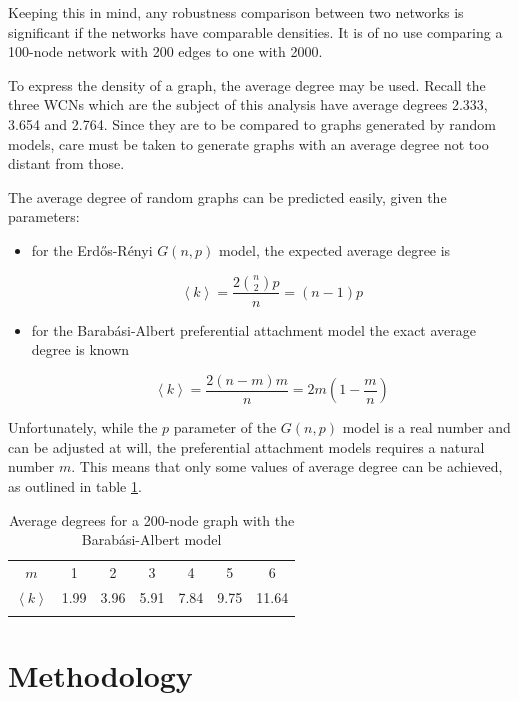 \documentclass[a4paper,11pt,twoside,openright]{memoir}
\begin{document}
Keeping this in mind, any robustness comparison between two networks is
significant if the networks have comparable densities. It is of no use
comparing a 100-node network with 200 edges to one with 2000.

To express the density of a graph, the average degree may be used.
Recall the three WCNs which are the subject of this analysis have
average degrees 2.333, 3.654 and 2.764. Since they are to be compared to
graphs generated by random models, care must be taken to generate graphs
with an average degree not too distant from those.

The average degree of random graphs can be predicted easily, given the
parameters:

\begin{itemize}
\item
  for the Erd\H{o}s-Rényi $G(n,p)$ model, the expected average degree is

  \begin{equation}
  \left< k \right> = \frac{2 \binom{n}{2} p}{n} = (n-1)p
  \end{equation}
\item
  for the Barabási-Albert preferential attachment model the exact
  average degree is known

  \begin{equation}
  \left< k \right> = \frac{2 (n-m)m}{n} = 2m\left( 1 - \frac{m}{n} \right)
  \end{equation}
\end{itemize}

Unfortunately, while the $p$ parameter of the $G(n,p)$ model is a real
number and can be adjusted at will, the preferential attachment models
requires a natural number $m$. This means that only some values of
average degree can be achieved, as outlined in table \ref{tbl:b-a_degrees}.

\begin{longtable}[c]{@{}ccccccc@{}}
\toprule\addlinespace
$m$ & 1 & 2 & 3 & 4 & 5 & 6
\\\addlinespace
$\left< k \right>$ & 1.99 & 3.96 & 5.91 & 7.84 & 9.75 & 11.64
\\\addlinespace
\bottomrule
\addlinespace
\caption{Average degrees for a 200-node graph with the Barabási-Albert
model}
\label{tbl:b-a_degrees}
\end{longtable}

\section{Methodology}\label{methodology}
\end{document}
